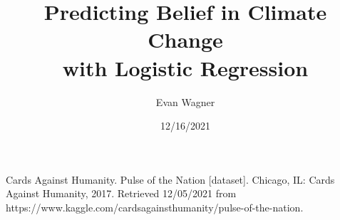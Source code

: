 \documentclass[12pt]{article}
\title{Predicting Belief in Climate Change\\ with Logistic Regression}
\author{Evan Wagner}
\date{12/16/2021}
\begin{document}
\maketitle

\tableofcontents







\begin{thebibliography}{99}
     Cards Against Humanity. Pulse of the Nation [dataset]. Chicago, IL: Cards Against Humanity, 2017. Retrieved 12/05/2021 from https://www.kaggle.com/cardsagainsthumanity/pulse-of-the-nation.
\end{thebibliography}
\end{document}
